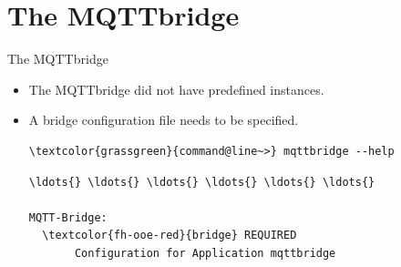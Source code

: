 ﻿\section[withsectionpage]{The MQTTbridge}

\begin{frame}[fragile]{The MQTTbridge}
\begin{itemize}
\item The MQTTbridge did not have predefined instances.
\item A bridge configuration file needs to be specified.
\begin{scriptsize}
\begin{Verbatim}[commandchars=\\\{\}]
\textcolor{grassgreen}{command@line~>} mqttbridge --help
\end{Verbatim}
\begin{Verbatim}[commandchars=\\\{\},frame=leftline,rulecolor=\color{fh-ooe-red}]
\ldots{} \ldots{} \ldots{} \ldots{} \ldots{} \ldots{}

MQTT-Bridge:
  \textcolor{fh-ooe-red}{bridge} REQUIRED
       Configuration for Application mqttbridge
\end{Verbatim}
\end{scriptsize}
\end{itemize}
\end{frame}
